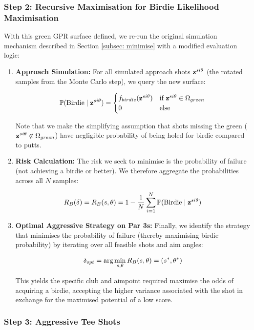 \documentclass[11pt, letterpaper]{article}
\begin{document}
\subsubsection{Step 2: Recursive Maximisation for Birdie Likelihood Maximisation}
With this green GPR surface defined, we re-run the original simulation mechanism described in Section \ref{subsec: minimise} with a modified evaluation logic:

\begin{enumerate}
\item \textbf{Approach Simulation:} For all simulated approach shots $\mathbf{z}^{si\theta}$ (the rotated samples from the Monte Carlo step), we query the new surface:

\[
\mathbb{P}(\text{Birdie} \mid \mathbf{z}^{si\theta}) = \begin{cases}
    f_{birdie}(\mathbf{z}^{si\theta}) & \text{if } \mathbf{z}^{si\theta} \in \Omega_{green} \\
    0 & \text{else}
\end{cases}
\]

Note that we make the simplifying assumption that shots missing the green ($\mathbf{z}^{si\theta} \not\in \Omega_{green}$) have negligible probability of being holed for birdie compared to putts.

\item \textbf{Risk Calculation:} The risk we seek to minimise is the probability of failure (not achieving a birdie or better). We therefore aggregate the probabilities across all $N$ samples:

$$R_{B}(\delta)= R_{B}(s, \theta) = 1 - \frac{1}{N} \sum_{i=1}^{N} \mathbb{P}(\text{Birdie} \mid \mathbf{z}^{si\theta})$$

\item \textbf{Optimal Aggressive Strategy on Par 3s:} Finally, we identify the strategy that minimises the probability of failure (thereby maximising birdie probability) by iterating over all feasible shots and aim angles:

$$\delta_{opt} = \arg \min_{s, \theta} R_B(s, \theta) = (s^*, \theta^*)$$

This yields the specific club and aimpoint required maximise the odds of acquiring a birdie, accepting the higher variance associated with the shot in exchange for the maximised potential of a low score.
\end{enumerate}

\subsubsection{Step 3: Aggressive Tee Shots}
\end{document}
